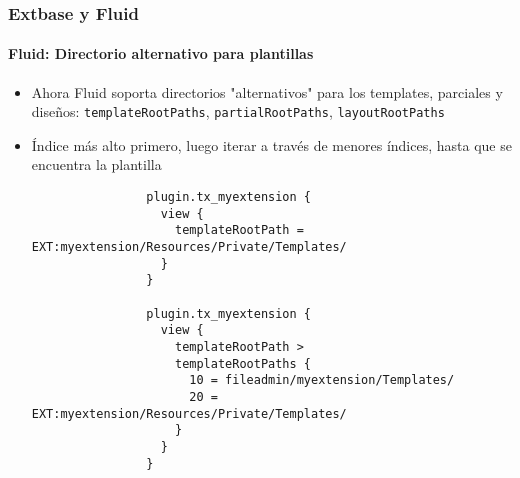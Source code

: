 \begin{frame}[fragile]
	\frametitle{Extbase y Fluid}
	\framesubtitle{Fluid: Directorio alternativo para plantillas}

	\lstset{
		basicstyle=\tiny\ttfamily
	}

	\begin{itemize}
		\item Ahora Fluid soporta directorios "alternativos" para los templates, parciales y diseños:\newline
			\smaller\texttt{templateRootPaths}, \texttt{partialRootPaths}, \texttt{layoutRootPaths}\normalsize
		\item Índice más alto primero, luego iterar a través de menores índices, hasta que se encuentra la plantilla

			\begin{lstlisting}
				plugin.tx_myextension {
				  view {
				    templateRootPath = EXT:myextension/Resources/Private/Templates/
				  }
				}

				plugin.tx_myextension {
				  view {
				    templateRootPath >
				    templateRootPaths {
				      10 = fileadmin/myextension/Templates/
				      20 = EXT:myextension/Resources/Private/Templates/
				    }
				  }
				}
			\end{lstlisting}

	\end{itemize}

\end{frame}


